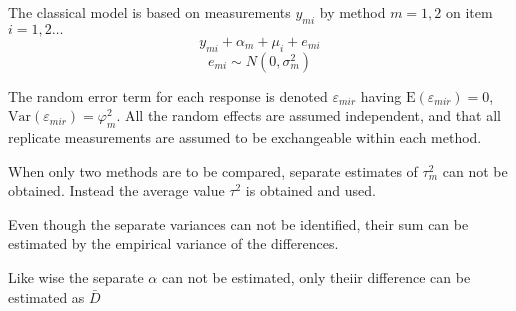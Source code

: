 \documentclass[12pt, a4paper]{report}
\theoremstyle{plain}
\theoremstyle{definition}
\theoremstyle{remark}
\begin{document}
The classical model is based on measurements $y_{mi}$ by method $m=1,2$ on item $i = 1,2 \ldots$
\[y_{mi} + \alpha_{m} + \mu_{i} + e_{mi}\]
\[e_{mi} \sim N(0,\sigma^2_m)\]




The random error term for each response is denoted $\varepsilon_{mir}$ having $\mathrm{E}(\varepsilon_{mir})=0$, $\mathrm{Var}(\varepsilon_{mir})=\varphi^2_m$. All the random effects are assumed independent, and that all replicate measurements are assumed to be exchangeable within each method.


When only two methods are to be compared, separate estimates of $\tau^2_m$ can not be obtained. Instead the average value $\tau^2$ is obtained and used.








\newpage
Even though the separate variances can not be identified, their sum can be estimated by the empirical variance of the differences.

Like wise the separate $\alpha$ can not be
estimated, only theiir difference can be estimated as
$\bar{D}$


\end{document}
